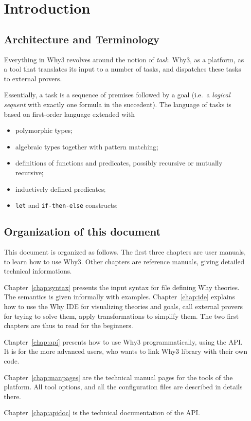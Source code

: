 
\chapter{Introduction}

\section{Architecture and Terminology}

Everything in Why3 revolves around the notion of
\emph{task}.  Why3, as a platform, as a tool that
translates its input to a number of tasks, and dispatches these tasks
to external provers. 

Essentially, a task is a sequence of premises followed by a goal
(i.e.~a \emph{logical sequent} with exactly one formula in the
succedent). The language of tasks is based on first-order language
extended with 
\begin{itemize}
\item polymorphic types;
\item algebraic types together with pattern matching;
\item definitions of functions and predicates, possibly recursive or
  mutually recursive;
\item inductively defined predicates;
\item \texttt{let} and \texttt{if-then-else} constructs;
\end{itemize}

\section{Organization of this document}

This document is organized as follows. The first three chapters are
user manuals, to learn how to use Why3. Other chapters are reference
manuals, giving detailed technical informations.

Chapter~\ref{chap:syntax} presents the input syntax for file defining
Why theories. The semantics is given informally with examples.
Chapter~\ref{chap:ide} explains how to use the Why IDE for visualizing
theories and goals, call external provers for trying to solve them,
apply transformations to simplify them. The two first chapters are
thus to read for the beginners.

Chapter~\ref{chap:api} presents how to use Why3 programmatically,
using the API.  It is for the more advanced users, who wants to link
Why3 library with their own code. 

Chapter~\ref{chap:manpages} are the technical manual pages for the tools of
the platform. All tool options, and all the configuration files are described in details there.

Chapter~\ref{chap:apidoc} is the technical documentation of the API.



